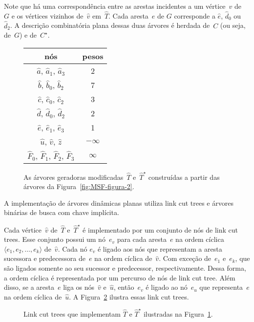 Note que há uma correspondência entre as arestas incidentes a um vértice~$v$ de~$G$ e os vértices vizinhos de~$\hat v$ em~$\hat T$.
Cada aresta~$e$ de $G$ corresponde a $\hat e$, $\hat d_0$ ou~$\hat d_2$. 
A descrição combinatória plana dessas duas árvores é herdada de~$C$ (ou seja, de~$G$) e de~$C^\star$.

\begin{figure}[htb]
\centering

\begin{tabular}{| c  c |} 
 \hline
 nós & pesos\\
 \hline
 $\hat a$, $\hat a_1$, $\hat a_3$ & 2 \\ 
 \hline
 $\hat b$, $\hat b_0$, $\hat b_2$ & 7 \\
 \hline
 $\hat c$, $\hat c_0$, $\hat c_2$ & 3 \\
 \hline
 $\hat d$, $\hat d_0$, $\hat d_2$ & 2 \\
 \hline
 $\hat e$, $\hat e_1$, $\hat e_3$ & 1 \\
 \hline
 $\hat u$, $\hat v$, $\hat z$ & $-\infty$ \\
 \hline
 $\hat F_0$, $\hat F_1$, $\hat F_2$, $\hat F_3$ & $\infty$ \\
 \hline
\end{tabular}
\caption{As árvores geradoras modificadas~$\hat T$ e~$\hat T^\star$ construídas a partir das árvores da Figura~\ref{fig:MSF-figura-2}.}
\label{fig:MSF-figura-3}
\end{figure}

A implementação de árvores dinâmicas planas utiliza link cut trees e árvores binárias de busca com chave implícita.

Cada vértice~$\hat v$ de~$\hat T$ e~$\hat T^\star$ é implementado por um conjunto de nós de link cut trees.
Esse conjunto possui um nó~$e_v$ para cada aresta~$e$ na ordem cíclica~$\langle e_1, e_2, \ldots, e_k\rangle$ de~$\hat v$.
Cada nó $e_v$ é ligado aos nós que representam a aresta sucessora e predecessora de~$e$ na ordem cíclica de~$\hat v$.
Com exceção de~$e_1$ e~$e_k$, que são ligados somente ao seu sucessor e predecessor, respectivamente.
Dessa forma, a ordem cíclica é representada por um percurso de nós de link cut tree.
Além disso, se a aresta~$e$ liga os nós~$\hat v$ e~$\hat u$, então~$e_v$ é ligado ao nó~$e_u$ que representa~$e$ na ordem cíclica de~$\hat u$.
A Figura~\ref{fig:MSF-figura-4} ilustra essas link cut trees.

\begin{figure}[htb]
\scalebox{1.5}{
\centering

}
\caption{Link cut trees que implementam $\hat T$ e $\hat T^\star$ ilustradas na Figura~\ref{fig:MSF-figura-3}.}
\label{fig:MSF-figura-4}
\end{figure}

